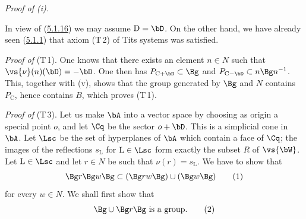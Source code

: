 \documentclass[12pt,a4paper,oneside,english]{smfart}
\makeatletter
\newcommand{\btanchor}[1]{\leavevmode\Hy@raisedlink{\hypertarget{bt:#1}{}}}
\newcommand{\btref}[1]{\hyperlink{bt:#1}{#1}}
\theoremstyle{definition}
\theoremstyle{bt}
\makeatother
\begin{document}
\btanchor{5.1.21}
\emph{Proof of \textup{(i)}.}

In view of (\btref{5.1.16}) we may assume $\mathrm{D}=\bD$. On the other hand, we have
already seen (\btref{5.1.1}) that axiom (T\,2) of Tits systems was satisfied.

\smallskip
\emph{Proof of} (T\,1). One knows that there exists an element $n\in N$ such
that $\vs{\nu}(n)(\bD)=-\bD$. One then has $P_{\mathrm{C}+\bD}\subset\Bg$ and
$P_{\mathrm{C}-\bD}\subset n\Bg n^{-1}$. This, together with (v), shows that the
group generated by $\Bg$ and $N$ contains $P_{\mathrm{C}}$, hence contains $B$,
which proves (T\,1).

\smallskip
\emph{Proof of} (T\,3). Let us make $\bA$ into a vector space by choosing as
origin a special point $o$, and let $\Cq$ be the sector $o+\bD$. This is a
simplicial cone in $\bA$. Let $\Lsc$ be the set of hyperplanes of $\bA$ which
contain a face of $\Cq$; the images of the reflections $s_{\mathrm{L}}$ for
$\mathrm{L}\in\Lsc$ form exactly the subset $R$ of $\vs{\bW}$. Let
$\mathrm{L}\in\Lsc$ and let $r\in N$ be such that $\nu(r)=s_{\mathrm{L}}$. We
have to show that
\begin{equation*}
\Bg r\Bg w\Bg\subset(\Bg rw\Bg)\cup(\Bg w\Bg)\tag{1}
\end{equation*}
for every $w\in N$. We shall first show that
\begin{equation*}
\Bg\cup\Bg r\Bg\ \text{is a group.}\tag{2}
\end{equation*}
\end{document}

